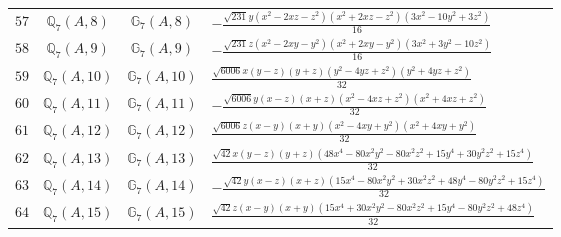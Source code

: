 \documentclass[fleqn,8pt,landscape]{jsarticle}
\begin{document}
\begin{table}[ht!]
\begin{center}
\begin{tabular}{cccl}
$ 57 $ & $ \mathbb{Q}_{7}(A,8) $ & $ \mathbb{G}_{7}(A,8) $ & $ - \frac{\sqrt{231} y \left(x^{2} - 2 x z - z^{2}\right) \left(x^{2} + 2 x z - z^{2}\right) \left(3 x^{2} - 10 y^{2} + 3 z^{2}\right)}{16} $ \\
$ 58 $ & $ \mathbb{Q}_{7}(A,9) $ & $ \mathbb{G}_{7}(A,9) $ & $ - \frac{\sqrt{231} z \left(x^{2} - 2 x y - y^{2}\right) \left(x^{2} + 2 x y - y^{2}\right) \left(3 x^{2} + 3 y^{2} - 10 z^{2}\right)}{16} $ \\
$ 59 $ & $ \mathbb{Q}_{7}(A,10) $ & $ \mathbb{G}_{7}(A,10) $ & $ \frac{\sqrt{6006} x \left(y - z\right) \left(y + z\right) \left(y^{2} - 4 y z + z^{2}\right) \left(y^{2} + 4 y z + z^{2}\right)}{32} $ \\
$ 60 $ & $ \mathbb{Q}_{7}(A,11) $ & $ \mathbb{G}_{7}(A,11) $ & $ - \frac{\sqrt{6006} y \left(x - z\right) \left(x + z\right) \left(x^{2} - 4 x z + z^{2}\right) \left(x^{2} + 4 x z + z^{2}\right)}{32} $ \\
$ 61 $ & $ \mathbb{Q}_{7}(A,12) $ & $ \mathbb{G}_{7}(A,12) $ & $ \frac{\sqrt{6006} z \left(x - y\right) \left(x + y\right) \left(x^{2} - 4 x y + y^{2}\right) \left(x^{2} + 4 x y + y^{2}\right)}{32} $ \\
$ 62 $ & $ \mathbb{Q}_{7}(A,13) $ & $ \mathbb{G}_{7}(A,13) $ & $ \frac{\sqrt{42} x \left(y - z\right) \left(y + z\right) \left(48 x^{4} - 80 x^{2} y^{2} - 80 x^{2} z^{2} + 15 y^{4} + 30 y^{2} z^{2} + 15 z^{4}\right)}{32} $ \\
$ 63 $ & $ \mathbb{Q}_{7}(A,14) $ & $ \mathbb{G}_{7}(A,14) $ & $ - \frac{\sqrt{42} y \left(x - z\right) \left(x + z\right) \left(15 x^{4} - 80 x^{2} y^{2} + 30 x^{2} z^{2} + 48 y^{4} - 80 y^{2} z^{2} + 15 z^{4}\right)}{32} $ \\
$ 64 $ & $ \mathbb{Q}_{7}(A,15) $ & $ \mathbb{G}_{7}(A,15) $ & $ \frac{\sqrt{42} z \left(x - y\right) \left(x + y\right) \left(15 x^{4} + 30 x^{2} y^{2} - 80 x^{2} z^{2} + 15 y^{4} - 80 y^{2} z^{2} + 48 z^{4}\right)}{32} $ \\
 \hline \hline
\end{tabular}
\end{center}
\end{table}
\end{document}
